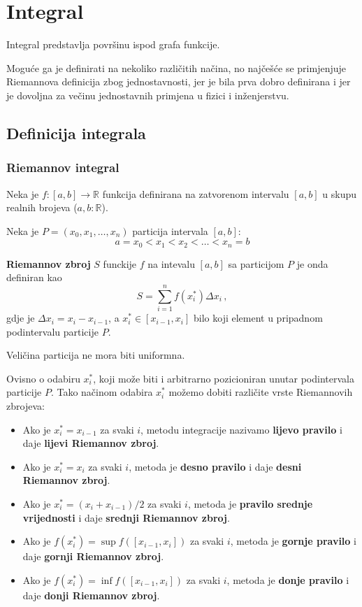 \section{Integral}

Integral predstavlja površinu ispod grafa funkcije.

Moguće ga je definirati na nekoliko različitih načina, no najčešće se
primjenjuje Riemannova definicija zbog jednostavnosti, jer je bila prva dobro
definirana i jer je dovoljna za večinu jednostavnih primjena u fizici i
inženjerstvu.

\subsection{Definicija integrala}

\subsubsection{Riemannov integral}

\begin{definition}
    Neka je $f: [a, b] \to \mathbb{R}$ funkcija definirana na zatvorenom
    intervalu $[a,b]$ u skupu realnih brojeva ($a,b: \mathbb{R}$).
    
    Neka je $P = (x_0, x_1, \dots, x_n)$ particija intervala $[a,b]$:
    $$
        a = x_0 < x_1 < x_2 < \dots < x_n = b
    $$

    \textbf{Riemannov zbroj} $S$ funckije $f$ na intevalu $[a,b]$ sa particijom
    $P$ je onda definiran kao
    $$
        S= \sum_{i=1}^n f(x_i^*) \Delta x_i\,,
    $$
    gdje je $\Delta x_i = x_i - x_{i-1}$, a $x_i^*\in[x_{i-1},x_i]$ bilo koji
    element u pripadnom podintervalu particije $P$.
\end{definition}

Veličina particija ne mora biti uniformna.

Ovisno o odabiru $x_i^*$, koji može biti i arbitrarno pozicioniran unutar
podintervala particije $P$.
Tako načinom odabira $x_i^*$ možemo dobiti različite vrste Riemannovih zbrojeva:
\begin{itemize}
    \item Ako je $x_i^* = x_{i-1}$ za svaki $i$, metodu integracije nazivamo \textbf{lijevo pravilo} i daje \textbf{lijevi Riemannov zbroj}.
    \item Ako je $x_i^* = x_i$ za svaki $i$, metoda je \textbf{desno pravilo} i daje \textbf{desni Riemannov zbroj}.
    \item Ako je $x_i^* = (x_i + x_{i-1})/2$ za svaki $i$, metoda je \textbf{pravilo srednje vrijednosti} i daje \textbf{srednji Riemannov zbroj}.
    \item Ako je $f(x_i^*) = \sup f([x_{i-1}, x_i])$ za svaki $i$, metoda je \textbf{gornje pravilo} i daje \textbf{gornji Riemannov zbroj}.
    \item Ako je $f(x_i^*) = \inf f([x_{i-1}, x_i])$ za svaki $i$, metoda je \textbf{donje pravilo} i daje \textbf{donji Riemannov zbroj}.
\end{itemize}


